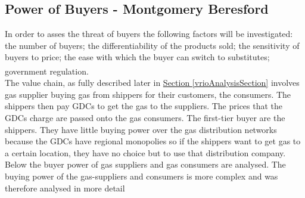 \documentclass[11pt]{article}		%
\newcommand{\supercite}[1]{\textsuperscript{\cite{#1}}}		%
\newcommand{\sectref}[1]{\hyperref[#1]{Section \ref*{#1}}}     %
\begin{document}
		\subsection[Power of Buyers]{Power of Buyers - Montgomery Beresford}
		        In order to asses the threat of buyers the following factors will be investigated: the number of buyers; the differentiability of the products sold; the sensitivity of buyers to price; the ease with which the buyer can switch to substitutes; government regulation.\supercite{Barney}
		        \\ \hspace*{3ex}
		        The value chain, as fully described later in \sectref{vrioAnalysisSection} involves gas supplier buying gas from shippers for their customers, the consumers. The shippers then pay GDCs to  get the gas to the suppliers. The prices that the GDCs charge are passed onto the gas consumers. The first-tier buyer are the shippers. They have little buying power over the gas distribution networks because the GDCs have regional monopolies so if the shippers want to get gas to a certain location, they have no choice but to use that distribution company. Below the buyer power of gas suppliers and gas consumers are analysed. The buying power of the gas-suppliers and consumers is more complex and was therefore analysed in more detail
		        
\end{document}
